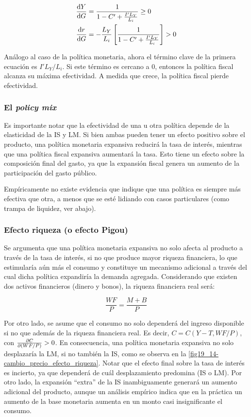 \documentclass[DeGregorioResumen]{subfiles}
\begin{document}
\begin{align*}
\frac{\mathrm{d}Y}{\mathrm{d}G} &= \frac{1}{1-C' + \frac{I' L_Y}{L_i}}  \geq 0 \\
\frac{\mathrm{d}r}{\mathrm{d}G} &= -\frac{L_Y}{L_i} \left [\frac{1}{1-C' + \frac{I' L_Y}{L_i}} \right ]  > 0 
\end{align*}

Análogo al caso de la política monetaria, ahora el término clave de la primera ecuación es $I'L_Y/L_i$. Si este término es cercano a 0, entonces la política fiscal alcanza su máxima efectividad. A medida que crece, la política fiscal pierde efectividad.

\subsubsection{El \textit{policy mix}}

Es importante notar que la efectividad de una u otra política depende de la elasticidad de la IS y LM. Si bien ambas pueden tener un efecto positivo sobre el producto, una política monetaria expansiva reducirá la tasa de interés, mientras que una política fiscal expansiva aumentará la tasa. Esto tiene un efecto sobre la composición final del gasto, ya que la expansión fiscal genera un aumento de la participación del gasto público.

Empíricamente  no existe evidencia que indique que una política es siempre más efectiva que otra, a menos que se esté lidiando con casos particulares (como trampa de liquidez, ver abajo).

\subsubsection{Efecto riqueza (o efecto Pigou)}

Se argumenta que una política monetaria expansiva no solo afecta al producto a través de la tasa de interés, si no que produce mayor riqueza financiera, lo que estimularía aún más el consumo y constituye un mecanismo adicional a través del cual dicha política expandiría la demanda agregada. Considerando que existen dos activos financieros (dinero y bonos), la riqueza financiera real será:

\begin{equation*}
	\frac{WF}{P} = \frac{M+B}{P}
\end{equation*}

Por otro lado, se asume que el consumo no solo dependerá del ingreso disponible si no que además de la riqueza financiera real. Es decir, $C=C(Y-T, WF/P)$, con $\frac{\partial C}{\partial(WF/P)}>0$. En consecuencia, una política monetaria expansiva no solo desplazaría la LM, si no también la IS, como se observa en la \autoref{fig19_14-cambio_precio_efecto_riqueza}. Notar que el efecto final sobre la tasa de interés es incierto, ya que dependerá de cuál desplazamiento predomina (IS o LM). Por otro lado, la expansión ``extra'' de la IS inambiguamente generará un aumento adicional del producto, aunque un análisis empírico indica que en la práctica un aumento de la base monetaria aumenta en un monto casi insignificante el consumo.
\end{document}
